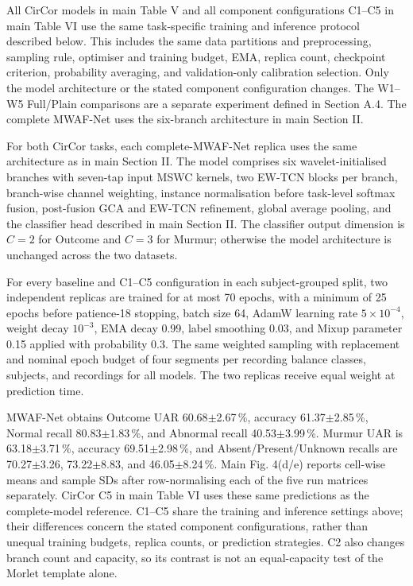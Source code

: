 All CirCor models in main Table V and all component configurations C1--C5 in main Table VI use the same task-specific training and inference protocol described below. This includes the same data partitions and preprocessing, sampling rule, optimiser and training budget, EMA, replica count, checkpoint criterion, probability averaging, and validation-only calibration selection. Only the model architecture or the stated component configuration changes. The W1--W5 Full/Plain comparisons are a separate experiment defined in Section A.4. The complete MWAF-Net uses the six-branch architecture in main Section II.

For both CirCor tasks, each complete-MWAF-Net replica uses the same architecture as in main Section II. The model comprises six wavelet-initialised branches with seven-tap input MSWC kernels, two EW-TCN blocks per branch, branch-wise channel weighting, instance normalisation before task-level softmax fusion, post-fusion GCA and EW-TCN refinement, global average pooling, and the classifier head described in main Section II. The classifier output dimension is $C=2$ for Outcome and $C=3$ for Murmur; otherwise the model architecture is unchanged across the two datasets.

For every baseline and C1--C5 configuration in each subject-grouped split, two independent replicas are trained for at most 70 epochs, with a minimum of 25 epochs before patience-18 stopping, batch size 64, AdamW learning rate $5\times10^{-4}$, weight decay $10^{-3}$, EMA decay 0.99, label smoothing 0.03, and Mixup parameter 0.15 applied with probability 0.3. The same weighted sampling with replacement and nominal epoch budget of four segments per recording balance classes, subjects, and recordings for all models. The two replicas receive equal weight at prediction time.

MWAF-Net obtains Outcome UAR 60.68$\pm$2.67\,\%, accuracy 61.37$\pm$2.85\,\%, Normal recall 80.83$\pm$1.83\,\%, and Abnormal recall 40.53$\pm$3.99\,\%. Murmur UAR is 63.18$\pm$3.71\,\%, accuracy 69.51$\pm$2.98\,\%, and Absent/Present/Unknown recalls are 70.27$\pm$3.26, 73.22$\pm$8.83, and 46.05$\pm$8.24\,\%. Main Fig. 4(d/e) reports cell-wise means and sample SDs after row-normalising each of the five run matrices separately. CirCor C5 in main Table VI uses these same predictions as the complete-model reference. C1--C5 share the training and inference settings above; their differences concern the stated component configurations, rather than unequal training budgets, replica counts, or prediction strategies. C2 also changes branch count and capacity, so its contrast is not an equal-capacity test of the Morlet template alone.

